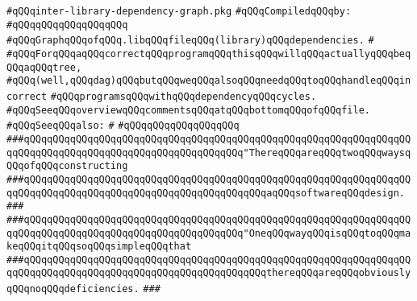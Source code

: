 \label{src/app/makelib/depend/inter-library-dependency-graph.pkg}
\verb|#qQQqinter-library-dependency-graph.pkg|\newline
\newline
\verb|#qQQqCompiledqQQqby:|\newline
\verb|#qQQqqQQqqQQqqQQqqQQq|\newline
\newline
\verb|#qQQqGraphqQQqofqQQq.libqQQqfileqQQq(library)qQQqdependencies.|\newline
\verb|#|\newline
\verb|#qQQqForqQQqaqQQqcorrectqQQqprogramqQQqthisqQQqwillqQQqactuallyqQQqbeqQQqaqQQqtree,|\newline
\verb|#qQQq(well,qQQqdag)qQQqbutqQQqweqQQqalsoqQQqneedqQQqtoqQQqhandleqQQqincorrect|\newline
\verb|#qQQqprogramsqQQqwithqQQqdependencyqQQqcycles.|\newline
\newline
\verb|#qQQqSeeqQQqoverviewqQQqcommentsqQQqatqQQqbottomqQQqofqQQqfile.|\newline
\newline
\verb|#qQQqSeeqQQqalso:|\newline
\verb|#|\newline
\verb|#qQQqqQQqqQQqqQQqqQQq|\newline
\newline
\newline
\verb|###qQQqqQQqqQQqqQQqqQQqqQQqqQQqqQQqqQQqqQQqqQQqqQQqqQQqqQQqqQQqqQQqqQQqqQQqqQQqqQQqqQQqqQQqqQQqqQQqqQQqqQQqqQQq"ThereqQQqareqQQqtwoqQQqwaysqQQqofqQQqconstructing|\newline
\verb|###qQQqqQQqqQQqqQQqqQQqqQQqqQQqqQQqqQQqqQQqqQQqqQQqqQQqqQQqqQQqqQQqqQQqqQQqqQQqqQQqqQQqqQQqqQQqqQQqqQQqqQQqqQQqqQQqaqQQqsoftwareqQQqdesign.|\newline
\verb|###|\newline
\verb|###qQQqqQQqqQQqqQQqqQQqqQQqqQQqqQQqqQQqqQQqqQQqqQQqqQQqqQQqqQQqqQQqqQQqqQQqqQQqqQQqqQQqqQQqqQQqqQQqqQQqqQQqqQQq"OneqQQqwayqQQqisqQQqtoqQQqmakeqQQqitqQQqsoqQQqsimpleqQQqthat|\newline
\verb|###qQQqqQQqqQQqqQQqqQQqqQQqqQQqqQQqqQQqqQQqqQQqqQQqqQQqqQQqqQQqqQQqqQQqqQQqqQQqqQQqqQQqqQQqqQQqqQQqqQQqqQQqqQQqqQQqthereqQQqareqQQqobviouslyqQQqnoqQQqdeficiencies.|\newline
\verb|###|\newline
